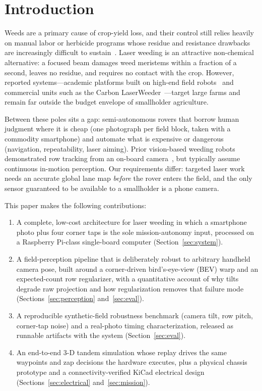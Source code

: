 \documentclass[conference]{IEEEtran}
\begin{document}
\section{Introduction}
Weeds are a primary cause of crop-yield loss, and their control still relies
heavily on manual labor or herbicide programs whose residue and resistance
drawbacks are increasingly difficult to sustain~\cite{oerke2006}. Laser
weeding is an attractive non-chemical alternative: a focused beam damages weed
meristems within a fraction of a second, leaves no residue, and requires no
contact with the crop. However, reported systems---academic platforms built on
high-end field robots~\cite{ruckelshausen2009,wu2020} and commercial units
such as the Carbon LaserWeeder~\cite{carbonrobotics}---target large farms and
remain far outside the budget envelope of smallholder agriculture.

Between these poles sits a gap: semi-autonomous rovers that borrow human
judgment where it is cheap (one photograph per field block, taken with a
commodity smartphone) and automate what is expensive or dangerous
(navigation, repeatability, laser aiming). Prior vision-based weeding robots
demonstrated row tracking from an on-board camera~\cite{astrand2002}, but
typically assume continuous in-motion perception. Our requirements differ:
targeted laser work needs an accurate global lane map \emph{before} the rover
enters the field, and the only sensor guaranteed to be available to a
smallholder is a phone camera.

This paper makes the following contributions:
\begin{enumerate}
  \item A complete, low-cost architecture for laser weeding in which a
        smartphone photo plus four corner taps is the sole mission-autonomy
        input, processed on a Raspberry Pi-class single-board computer
        (Section~\ref{sec:system}).
  \item A field-perception pipeline that is deliberately robust to arbitrary
        handheld camera pose, built around a corner-driven bird's-eye-view
        (BEV) warp and an expected-count row regularizer, with a quantitative
        account of why tilts degrade raw projection and how
        regularization removes that failure mode
        (Sections~\ref{sec:perception} and~\ref{sec:eval}).
  \item A reproducible synthetic-field robustness benchmark (camera tilt,
        row pitch, corner-tap noise) and a real-photo timing characterization,
        released as runnable artifacts with the system
        (Section~\ref{sec:eval}).
  \item An end-to-end 3-D tandem simulation whose replay drives the same
        waypoints and zap decisions the hardware executes, plus a physical
        chassis prototype and a connectivity-verified KiCad electrical
        design (Sections~\ref{sec:electrical} and~\ref{sec:mission}).
\end{enumerate}
\end{document}
